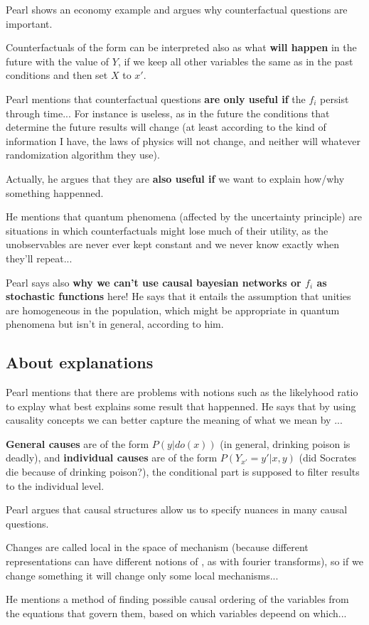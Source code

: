 Pearl shows an economy example and argues why counterfactual questions are important.

Counterfactuals of the form  can be interpreted also as what \textbf{will happen} in the future with the value of $Y$, if we keep all other variables the same as in the past conditions and then set $X$ to $x'$.

Pearl mentions that counterfactual questions \textbf{are only useful if} the $f_i$ persist through time... For instance  is useless, as in the future the conditions that determine the future results will change (at least according to the kind of information I have, the laws of physics will not change, and neither will whatever randomization algorithm they use).

Actually, he argues that they are \textbf{also useful if} we want to explain how/why something happenned.

He mentions that quantum phenomena (affected by the uncertainty principle) are situations in which counterfactuals might lose much of their utility, as the unobservables are never ever kept constant and we never know exactly when they'll repeat...

Pearl says also \textbf{why we can't use causal bayesian networks or $f_i$ as stochastic functions} here! He says that it entails the assumption that unities are homogeneous in the population, which might be appropriate in quantum phenomena but isn't in general, according to him.

\subsection{About explanations}

Pearl mentions that there are problems with notions such as the likelyhood ratio to explay what best explains some result that happenned. He says that by using causality concepts we can better capture the meaning of what we mean by ...

\textbf{General causes} are of the form $P(y|do(x))$ (in general, drinking poison is deadly), and \textbf{individual causes} are of the form $P(Y_{x'} = y'|x,y)$ (did Socrates die because of drinking poison?), the conditional part is supposed to filter results to the individual level.

Pearl argues that causal structures allow us to specify nuances in many causal questions.

Changes are called local in the space of mechanism (because different representations can have different notions of , as with fourier transforms), so if we change something it will change only some local mechanisms...

He mentions a method of finding possible causal ordering of the variables from the equations that govern them, based on which variables depeend on which...
